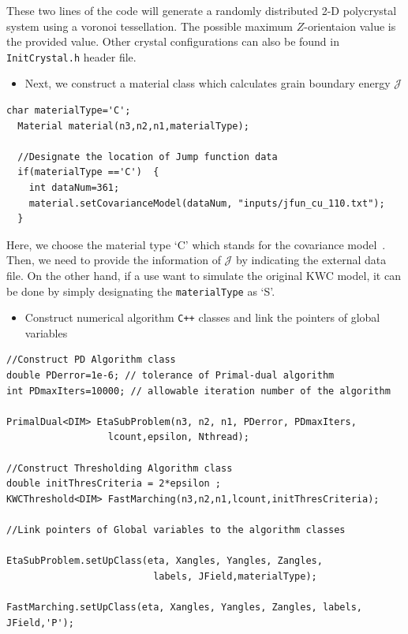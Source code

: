 \documentclass[11pt]{article}
\begin{document}
These two lines of the code will generate a randomly distributed 2-D polycrystal system
using a voronoi tessellation.
The possible maximum $Z$-orientaion value is the provided value.
Other crystal configurations can also be found in \texttt{InitCrystal.h} header file.


\begin{itemize} \item Next, we construct a material class 
which calculates grain boundary energy $\mathcal{J}$ \end{itemize}
 
\begin{tcolorbox}
\begin{lstlisting}[basicstyle=\footnotesize]
  char materialType='C';
  Material material(n3,n2,n1,materialType);

  //Designate the location of Jump function data
  if(materialType =='C')  {
    int dataNum=361;
    material.setCovarianceModel(dataNum, "inputs/jfun_cu_110.txt");
  }
\end{lstlisting}
\end{tcolorbox}
Here, we choose the material type `C' which stands 
for the covariance model~\cite{Runnels:2016_1,Runnels:2016_2}.
Then, we need to provide the information of $\mathcal{J}$ by
indicating the external data file.
On the other hand, if a use want to simulate the original KWC model, 
it can be done by simply designating the \texttt{materialType} as `S'.

\begin{itemize} \item Construct numerical algorithm \texttt{C++} classes
and link the pointers of global variables \end{itemize}

\begin{tcolorbox}
\begin{lstlisting}[basicstyle=\footnotesize]
//Construct PD Algorithm class
double PDerror=1e-6; // tolerance of Primal-dual algorithm
int PDmaxIters=10000; // allowable iteration number of the algorithm

PrimalDual<DIM> EtaSubProblem(n3, n2, n1, PDerror, PDmaxIters,
		          lcount,epsilon, Nthread);

//Construct Thresholding Algorithm class		          
double initThresCriteria = 2*epsilon ;
KWCThreshold<DIM> FastMarching(n3,n2,n1,lcount,initThresCriteria);
  
//Link pointers of Global variables to the algorithm classes

EtaSubProblem.setUpClass(eta, Xangles, Yangles, Zangles,
                          labels, JField,materialType);

FastMarching.setUpClass(eta, Xangles, Yangles, Zangles, labels, JField,'P');
    
\end{lstlisting}
\end{tcolorbox}
\end{document}
